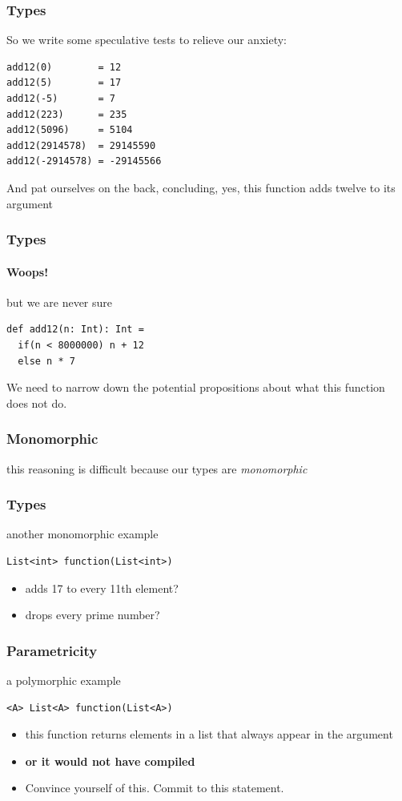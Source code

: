 \begin{frame}[fragile]
\frametitle{Types}
So we write some speculative tests to relieve our anxiety:
\begin{lstlisting}
add12(0)        = 12
add12(5)        = 17
add12(-5)       = 7
add12(223)      = 235
add12(5096)     = 5104
add12(2914578)  = 29145590
add12(-2914578) = -29145566
\end{lstlisting}
And pat ourselves on the back, concluding, yes, this function adds twelve to its argument
\end{frame}

\begin{frame}[fragile]
\frametitle{Types}
\framesubtitle{Woops!}
\begin{block}{but we are never sure}
\begin{lstlisting}
def add12(n: Int): Int =
  if(n < 8000000) n + 12
  else n * 7
\end{lstlisting}
\end{block}
We need to narrow down the potential propositions about what this function does not do.
\end{frame}

\begin{frame}
\frametitle{Monomorphic}
\begin{block}{this reasoning is difficult because}
our types are \emph{monomorphic}
\end{block}
\end{frame}

\begin{frame}[fragile]
\frametitle{Types}
\begin{block}{another monomorphic example}
\begin{lstlisting}
List<int> function(List<int>)
\end{lstlisting}
\end{block}
\begin{itemize}
  \item<1-> adds 17 to every 11th element?
  \item<2-> drops every prime number?
\end{itemize}
\end{frame}

\begin{frame}[fragile]
\frametitle{Parametricity}
\begin{block}{a polymorphic example}
\begin{lstlisting}
<A> List<A> function(List<A>)
\end{lstlisting}
\end{block}
\begin{itemize}
  \item<1-> this function returns elements in a list that always appear in the argument
  \item<1-> \textbf{or it would not have compiled}
  \item<2-> Convince yourself of this. Commit to this statement.
\end{itemize}
\end{frame}

